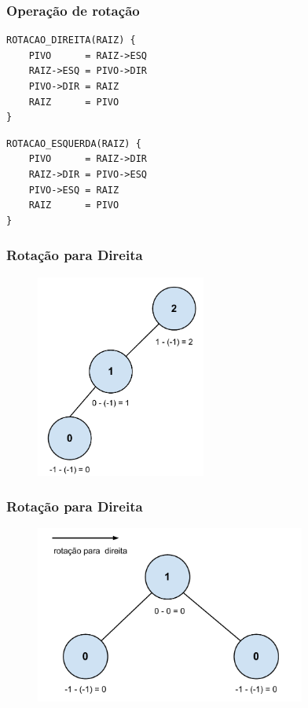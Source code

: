 \begin{frame}[fragile]
\frametitle{Operação de rotação}

\begin{verbatim}
ROTACAO_DIREITA(RAIZ) {
    PIVO      = RAIZ->ESQ
    RAIZ->ESQ = PIVO->DIR
    PIVO->DIR = RAIZ
    RAIZ      = PIVO
}
\end{verbatim}

\begin{verbatim}
ROTACAO_ESQUERDA(RAIZ) {
    PIVO      = RAIZ->DIR
    RAIZ->DIR = PIVO->ESQ
    PIVO->ESQ = RAIZ
    RAIZ      = PIVO
}
\end{verbatim}
\end{frame}

\begin{frame}
    \frametitle{Rotação para Direita}
    
    \begin{figure}[tbp]
    \includegraphics[keepaspectratio=true,width=2.2in]{figs/fig_arvores/Balanceamento_Arvore2}
    \centering
    \end{figure}
\end{frame}

\begin{frame}
    \frametitle{Rotação para Direita}
    
    \begin{figure}[tbp]
    \includegraphics[keepaspectratio=true,width=3.5in]{figs/fig_arvores/Balanceamento_Arvore3}
    \centering
    \end{figure}
\end{frame}


